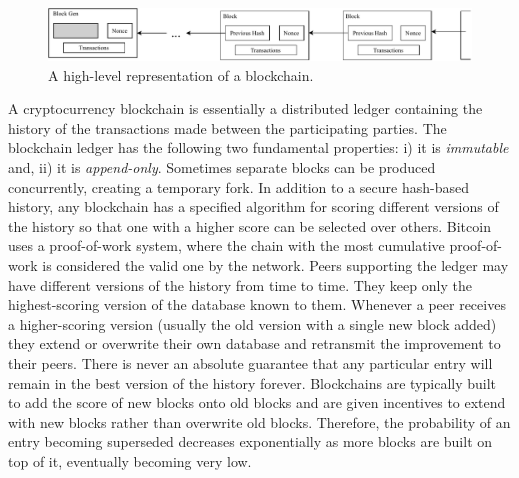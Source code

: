 \begin{figure}[h!]
	\begin{center}
		\includegraphics[scale=0.7]{figures/abstract_chain.pdf}
	\end{center}
	\caption{A high-level representation of a blockchain.}
	\label{fig:abstract_chain}
\end{figure}

A cryptocurrency blockchain is essentially a distributed ledger containing the history of the transactions made between the participating parties. The blockchain ledger has the following two fundamental properties: i) it is \emph{immutable} and, ii) it is \emph{append-only}. Sometimes separate blocks can be produced concurrently, creating a temporary fork. In addition to a secure hash-based history, any blockchain has a specified algorithm for scoring different versions of the history so that one with a higher score can be selected over others. Bitcoin uses a proof-of-work system, where the chain with the most cumulative proof-of-work is considered the valid one by the network. Peers supporting the ledger may have different versions of the history from time to time. They keep only the highest-scoring version of the database known to them. Whenever a peer receives a higher-scoring version (usually the old version with a single new block added) they extend or overwrite their own database and retransmit the improvement to their peers. There is never an absolute guarantee that any particular entry will remain in the best version of the history forever. Blockchains are typically built to add the score of new blocks onto old blocks and are given incentives to extend with new blocks rather than overwrite old blocks. Therefore, the probability of an entry becoming superseded decreases exponentially as more blocks are built on top of it, eventually becoming very low.

